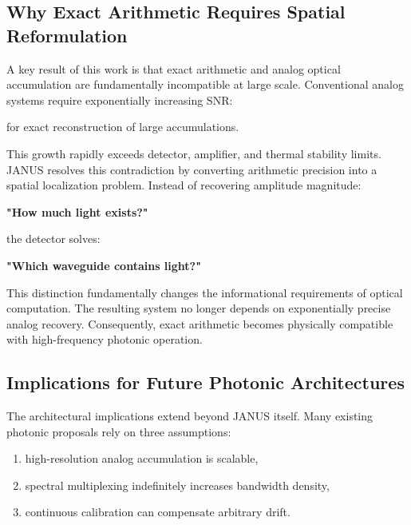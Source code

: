 \documentclass[journal]{IEEEtran}
\begin{document}
\subsection{\textbf{Why Exact Arithmetic Requires Spatial Reformulation}}

A key result of this work is that exact arithmetic and analog optical accumulation are fundamentally incompatible at large scale. Conventional analog systems require exponentially increasing SNR:

\begin{center}
\end{center}

for exact reconstruction of large accumulations.

This growth rapidly exceeds detector, amplifier, and thermal stability limits. JANUS resolves this contradiction by converting arithmetic precision into a spatial localization problem. Instead of recovering amplitude magnitude:

\begin{center}
\textbf{"How much light exists?"}
\end{center}

the detector solves:
\begin{center}
\textbf{"Which waveguide contains light?"}
\end{center}

This distinction fundamentally changes the informational requirements of optical computation. The resulting system no longer depends on exponentially precise analog recovery. Consequently, exact arithmetic becomes physically compatible with high-frequency photonic operation.

\subsection{\textbf{Implications for Future Photonic Architectures}}

The architectural implications extend beyond JANUS itself. Many existing photonic proposals rely on three assumptions:
\begin{enumerate}
\item high-resolution analog accumulation is scalable,
\item spectral multiplexing indefinitely increases bandwidth density,
\item continuous calibration can compensate arbitrary drift.
\end{enumerate}
\end{document}
